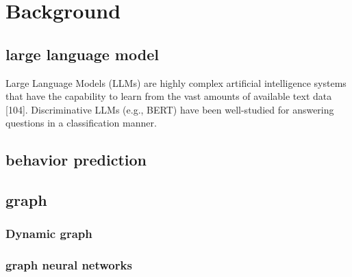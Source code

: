

\chapter{Background}\label{chapter:background}


\section{large language model}
Large Language Models (LLMs) are highly complex artificial intelligence systems that have the capability to learn from the vast amounts of available text data [104]. Discriminative LLMs (e.g., BERT) have been well-studied for answering questions in a classification manner. 
\section{behavior prediction}

\section{graph}

\subsection{Dynamic graph}

\subsection{graph neural networks}
